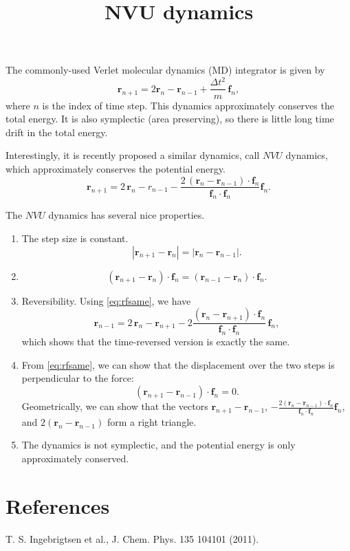\documentclass{article}
\begin{document}
\title{NVU dynamics}
\author{ \vspace{-10ex} }
\date{ \vspace{-10ex} }
\maketitle


The commonly-used Verlet molecular dynamics (MD) integrator is given by
\begin{equation}
\mathbf r_{n+1} =
2 \mathbf r_n - \mathbf r_{n-1} + \frac{\Delta t^2}{m} \, \mathbf f_n,
\end{equation}
where $n$ is the index of time step.
This dynamics approximately conserves the total energy.
It is also symplectic (area preserving),
so there is little long time drift in the total energy.

Interestingly, it is recently proposed a similar dynamics,
call $NVU$ dynamics, which approximately conserves
the potential energy.
\begin{equation}
\mathbf r_{n+1}
= 2 \, \mathbf r_n - r_{n-1}
- \frac{ 2 \, (\mathbf r_{n} - \mathbf r_{n - 1}) \cdot \mathbf f_n }
       { \mathbf f_n \cdot \mathbf f_n }
  \mathbf f_n.
\label{eq:nvu}
\end{equation}

The $NVU$ dynamics has several nice properties.
\begin{enumerate}
\item
The step size is constant.
$$
|\mathbf r_{n+1} - \mathbf r_n| = |\mathbf r_n - \mathbf r_{n-1}|.
$$


\item
\begin{equation}
(\mathbf r_{n+1} - \mathbf r_n) \cdot \mathbf f_n
=
(\mathbf r_{n-1} - \mathbf r_n) \cdot \mathbf f_n.
\label{eq:rfsame}
\end{equation}


\item
Reversibility. Using \eqref{eq:rfsame}, we have
$$
\mathbf r_{n-1} = 2 \, \mathbf r_n - \mathbf r_{n+1}
- 2 \frac{ ( \mathbf r_n - \mathbf r_{n+1} ) \cdot \mathbf f_n }
{ \mathbf f_n \cdot \mathbf f_n } \, \mathbf f_n,
$$
which shows that the time-reversed version is exactly the same.


\item
From \eqref{eq:rfsame}, we can show that
the displacement over the two steps is perpendicular to the force:
\begin{equation}
(\mathbf r_{n+1} - \mathbf r_{n-1}) \cdot \mathbf f_n = 0.
\end{equation}
Geometrically,
we can show that the vectors
$\mathbf r_{n+1} - \mathbf r_{n-1}$,
$-\frac{ 2 (\mathbf r_n - \mathbf r_{n-1}) \cdot \mathbf f_n } { \mathbf f_n \cdot \mathbf f_n } \mathbf f_n$,
and
$2 ( \mathbf r_n - \mathbf r_{n-1})$
form a right triangle.


\item
The dynamics is not symplectic, and the potential energy is only approximately conserved.

\end{enumerate}


\section{References}

T. S. Ingebrigtsen et al., J. Chem. Phys. 135 104101 (2011).
\end{document}
